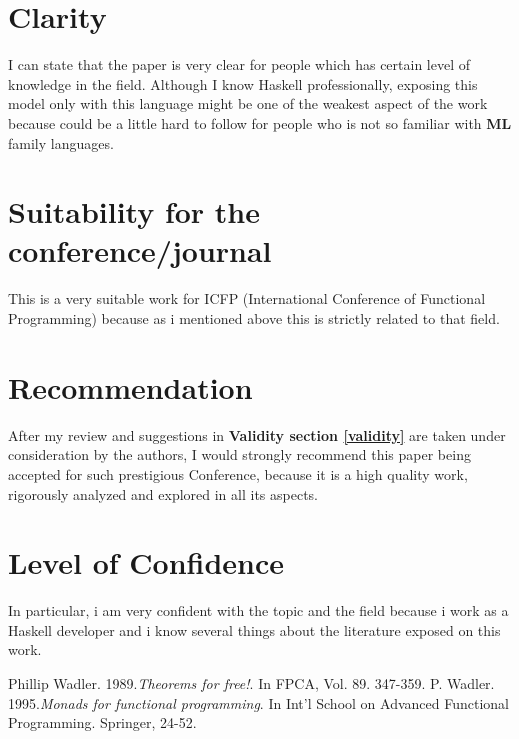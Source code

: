 \documentclass[12pt, a4paper]{article}
\begin{document}
\section{Clarity}
I can state that the paper is very clear for people which has certain level of
knowledge in the field. Although I know Haskell professionally, exposing this
model only with this language might be one of the weakest aspect of the work
because could be a little hard to follow for people who is not so familiar with \textbf{ML} family languages.

\section{Suitability for the conference/journal}
This is a very suitable work for ICFP (International Conference of Functional
Programming) because as i mentioned above this is strictly related to that
field.

\section{Recommendation}
After my review and suggestions in \textbf{Validity section \ref{validity}}
are taken under consideration by the authors, I would strongly recommend this
paper being accepted for such prestigious Conference, because it is a high
quality work, rigorously analyzed and explored in all its aspects.

\section{Level of Confidence}
In particular, i am very confident with the topic and the field because i work
as a Haskell developer and i know several things about the literature exposed on
this work. 

\begin{thebibliography}{9}
  Phillip Wadler. 1989.\textit{Theorems for free!}. In FPCA, Vol. 89. 347-359.
  P. Wadler. 1995.\textit{Monads for functional programming}. In Int'l School on
  Advanced Functional Programming. Springer, 24-52.
\end{thebibliography} 
\end{document}

